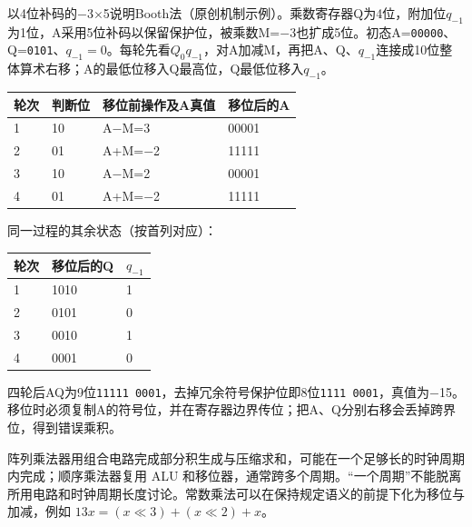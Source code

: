 以4位补码的\ensuremath{-}3\ensuremath{\times}5说明Booth法（原创机制示例）。乘数寄存器Q为4位，附加位\(q_{-1}\)为1位，A采用5位补码以保留保护位，被乘数M=\ensuremath{-}3也扩成5位。初态A=\texttt{00000}、Q=\texttt{0101}、\(q_{-1}=0\)。每轮先看\(Q_0q_{-1}\)，对A加减M，再把A、Q、\(q_{-1}\)连接成10位整体算术右移；A的最低位移入Q最高位，Q最低位移入\(q_{-1}\)。

\begin{wideblock}\par\medskip\noindent\begin{minipage}{\linewidth}\fontsize{9.3}{12}\selectfont\begin{tabularx}{\linewidth}{@{}YYYY@{}}
\toprule\noalign{}
轮次 & 判断位 & 移位前操作及A真值 & 移位后的A \\
\midrule\noalign{}


1 & 10 & A\ensuremath{-}M=3 & 00001 \\
2 & 01 & A+M=\ensuremath{-}2 & 11111 \\
3 & 10 & A\ensuremath{-}M=2 & 00001 \\
4 & 01 & A+M=\ensuremath{-}2 & 11111 \\
\bottomrule\end{tabularx}
\end{minipage}\par\medskip\end{wideblock}

同一过程的其余状态（按首列对应）：

\par\medskip\noindent\begin{minipage}{\linewidth}\fontsize{9.3}{12}\selectfont\begin{tabularx}{\linewidth}{@{}YYY@{}}
\toprule\noalign{}
轮次 & 移位后的Q & \(q_{-1}\) \\
\midrule\noalign{}


1 & 1010 & 1 \\
2 & 0101 & 0 \\
3 & 0010 & 1 \\
4 & 0001 & 0 \\
\bottomrule\end{tabularx}
\end{minipage}\par\medskip

四轮后AQ为9位\texttt{11111 0001}，去掉冗余符号保护位即8位\texttt{1111 0001}，真值为\ensuremath{-}15。移位时必须复制A的符号位，并在寄存器边界传位；把A、Q分别右移会丢掉跨界位，得到错误乘积。

阵列乘法器用组合电路完成部分积生成与压缩求和，可能在一个足够长的时钟周期内完成；顺序乘法器复用 ALU 和移位器，通常跨多个周期。``一个周期''不能脱离所用电路和时钟周期长度讨论。常数乘法可以在保持规定语义的前提下化为移位与加减，例如 \(13x=(x\ll3)+(x\ll2)+x\)。


